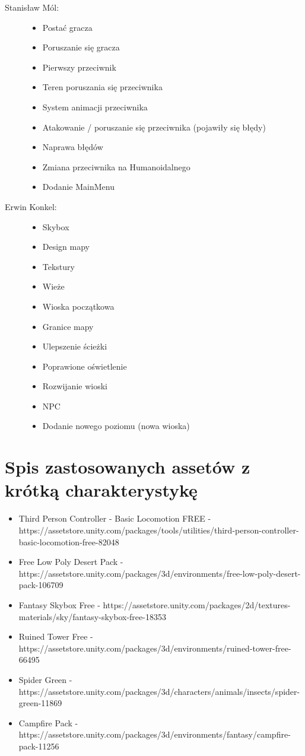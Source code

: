 \documentclass[10pt,a4paper]{article}
\begin{document}
\vspace{0.5cm}
\begin{description}
  \item[Stanisław Mól:] \hfill
  	\begin{itemize}
 	  \item Postać gracza
 	  \item Poruszanie się gracza
	  \item Pierwszy przeciwnik
	  \item Teren poruszania się przeciwnika
	  \item System animacji przeciwnika
	  \item Atakowanie / poruszanie się przeciwnika (pojawiły się błędy)
	  \item Naprawa błędów
	  \item Zmiana przeciwnika na Humanoidalnego
	  \item Dodanie MainMenu
	\end{itemize}
  \item[ Erwin Konkel:] \hfill
  	\begin{itemize}
          \item Skybox
  	  \item Design mapy
 	  \item Tekstury
  	  \item Wieże
	  \item Wioska początkowa
 	  \item Granice mapy
  	  \item Ulepszenie ścieżki 
  	  \item Poprawione oświetlenie
	  \item Rozwijanie wioski
	  \item NPC
	  \item Dodanie nowego poziomu (nowa wioska)
	\end{itemize}
\end{description}

\clearpage
\section{Spis zastosowanych assetów z krótką charakterystykę}
\begin{itemize}
  \item Third Person Controller - Basic Locomotion FREE - https://assetstore.unity.com/packages/tools/utilities/third-person-controller-basic-locomotion-free-82048
  \item Free Low Poly Desert Pack - https://assetstore.unity.com/packages/3d/environments/free-low-poly-desert-pack-106709
  \item Fantasy Skybox Free - https://assetstore.unity.com/packages/2d/textures-materials/sky/fantasy-skybox-free-18353
  \item Ruined Tower Free - https://assetstore.unity.com/packages/3d/environments/ruined-tower-free-66495
  \item Spider Green - https://assetstore.unity.com/packages/3d/characters/animals/insects/spider-green-11869
  \item Campfire Pack - https://assetstore.unity.com/packages/3d/environments/fantasy/campfire-pack-11256
\end{itemize}
\end{document}
